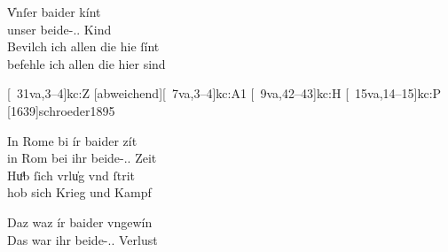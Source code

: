 
\begin{exe}
\ex \label{ex:k_beider}
	\begin{xlist}
	\ex \label{ex:k_beider_1}
		\gll V̍nſer baider kínt \\
			unser beide-\Gen.\Pl.\St{} Kind \\
	\sn \gll Bevilch ich allen die hie ſínt \\
			befehle ich allen die hier sind \\
		\begin{taggedline}{\parencites%
			[\pno~9rb,25--26]{kc:K}[vgl.]%
			[\pno~8vb,27--28]{kc:C1}%
			[\pno~31va,3--4]{kc:Z}%
			[abweichend][\pno~7va,3--4]{kc:A1}%
			[\pno~9va,42--43]{kc:H}%
			[\pno~15va,14--15]{kc:P}%
			[1639]{schroeder1895}
		}
		\trans {}
		\end{taggedline}

	\ex \label{ex:k_beider_2}
		\gll In Rome bi ír baider zít \\
			in Rom bei ihr beide-\Gen.\Pl.\St{} Zeit \\
	\sn \gll Huͦb ſich vrlu̍g vnd ſtrit \\
			hob sich Krieg und Kampf \\
		\begin{taggedline}{\parencites
			[\pno~28vb,36--37]{kc:K}[vgl.]%
			[\pno~93va,26--\pno~94ra,1]{kc:Z}[abweichend]%
			[\pno~14va,49--50]{kc:B1}%
			[\pno~24ra,30--31]{kc:VB}%
			[\pno~42ra,17--18]{kc:P}%
			[\pno~20vb,9--10]{kc:A1}%
			[\pno~36rb,6--7]{kc:M}%
			[\pno~28rb,39--40]{kc:H}%
			[4837--4838]{schroeder1895}%
		}
		\trans {}
		\end{taggedline}

	\ex \label{ex:k_beider_3}
		\gll Daz waz ír baider vngewín \\
			Das war ihr beide-\Gen.\Pl.\St{} Verlust \\
		\begin{taggedline}{\parencites%
			[\pno~103vb,27]{kc:K}[vgl.]
			[\pno~91va,10]{kc:C1}%
			[\pno~60va,34]{kc:VC}%
			[\pno~352ra,6]{kc:Z}%
			[208]{schroeder1895}%
		}
		\trans {}
		\end{taggedline}
	\end{xlist}
\end{exe}

